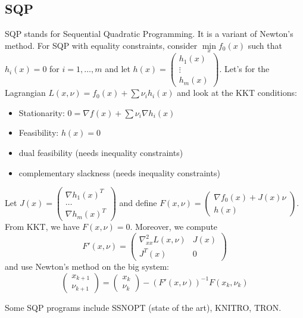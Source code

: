 \documentclass[english, 11pt]{article}
\begin{document}
\subsection{SQP}
SQP stands for Sequential Quadratic Programming.  It is a variant of Newton's method. For SQP with equality constraints, consider $\min \limits_x f_0(x)$ such that $h_i(x)=0$ for $i=1,\dots,m$ and let $h(x) = \begin{pmatrix} h_1(x) \\ \vdots \\ h_m(x) \end{pmatrix}$. Let's for the Lagrangian
$L(x,\nu) = f_0(x) + \sum \nu_i h_i(x)$
and look at the KKT conditions:
\begin{itemize}
\item Stationarity: $0 = \nabla f(x) + \sum \nu_i \nabla h_i(x)$

\item Feasibility: $h(x) =0$

\item dual feasibility (needs inequality constraints)

\item complementary slackness (needs inequality constraints)
\end{itemize}

Let $J(x) = \begin{pmatrix} \nabla h_1(x)^T \\ \dots \\ \nabla h_m(x)^T \end{pmatrix}$ and define $F(x,\nu) = \begin{pmatrix} \nabla f_0(x) + J(x) \nu \\ h(x) \end{pmatrix}$. From KKT, we have $F(x,\nu)=0$. Moreover, we compute
\[
F'(x,\nu) = \begin{pmatrix} \nabla^2_{xx} L(x,\nu) & J(x) \\ J^T(x) & 0 \end{pmatrix}
\]
and use Newton's method on the big system:
\[
\begin{pmatrix} x_{k+1} \\ \nu_{k+1} \end{pmatrix}
=
\begin{pmatrix} x_{k} \\ \nu_{k} \end{pmatrix}
- (F'(x,\nu))^{-1} F(x_k, \nu_k)
\]


\begin{rem}
Some SQP programs include SSNOPT (state of the art), KNITRO, TRON.
\end{rem}
\end{document}
